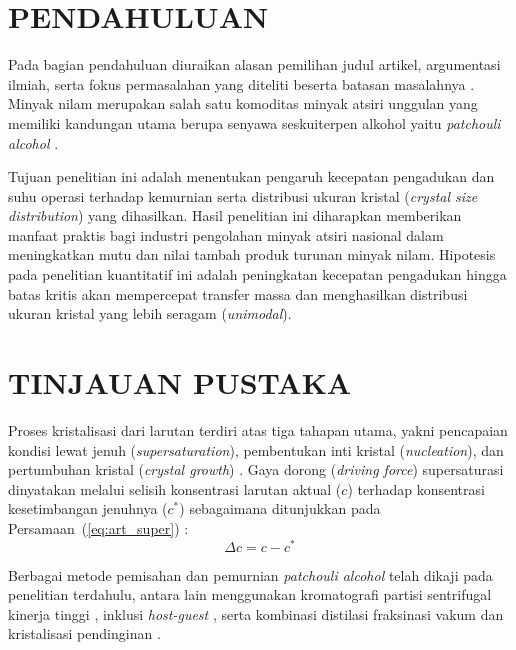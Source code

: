 \documentclass[a4paper,12pt,twoside]{article}
\begin{document}
\section*{PENDAHULUAN}
Pada bagian pendahuluan diuraikan alasan pemilihan judul artikel, argumentasi ilmiah, serta fokus permasalahan yang diteliti beserta batasan masalahnya \citep{harunsyah2021, alzoubi2023}. Minyak nilam merupakan salah satu komoditas minyak atsiri unggulan yang memiliki kandungan utama berupa senyawa seskuiterpen alkohol yaitu \textit{patchouli alcohol} \citep{isfaroiny2005, bhatia2008}.

Tujuan penelitian ini adalah menentukan pengaruh kecepatan pengadukan dan suhu operasi terhadap kemurnian serta distribusi ukuran kristal (\textit{crystal size distribution}) yang dihasilkan. Hasil penelitian ini diharapkan memberikan manfaat praktis bagi industri pengolahan minyak atsiri nasional dalam meningkatkan mutu dan nilai tambah produk turunan minyak nilam. Hipotesis pada penelitian kuantitatif ini adalah peningkatan kecepatan pengadukan hingga batas kritis akan mempercepat transfer massa dan menghasilkan distribusi ukuran kristal yang lebih seragam (\textit{unimodal}).

\section*{TINJAUAN PUSTAKA}
Proses kristalisasi dari larutan terdiri atas tiga tahapan utama, yakni pencapaian kondisi lewat jenuh (\textit{supersaturation}), pembentukan inti kristal (\textit{nucleation}), dan pertumbuhan kristal (\textit{crystal growth}) \citep{mersmann2001a, mullin2001, jones2002}. Gaya dorong (\textit{driving force}) supersaturasi dinyatakan melalui selisih konsentrasi larutan aktual ($c$) terhadap konsentrasi kesetimbangan jenuhnya ($c^*$) sebagaimana ditunjukkan pada Persamaan~(\ref{eq:art_super}) \citep{schwartz2002, tung2009}:
\begin{equation}
  \Delta c = c - c^*
  \label{eq:art_super}
\end{equation}

Berbagai metode pemisahan dan pemurnian \textit{patchouli alcohol} telah dikaji pada penelitian terdahulu, antara lain menggunakan kromatografi partisi sentrifugal kinerja tinggi \citep{li2021}, inklusi \textit{host-guest} \citep{tong2022}, serta kombinasi distilasi fraksinasi vakum dan kristalisasi pendinginan \citep{su2014}.
\end{document}
